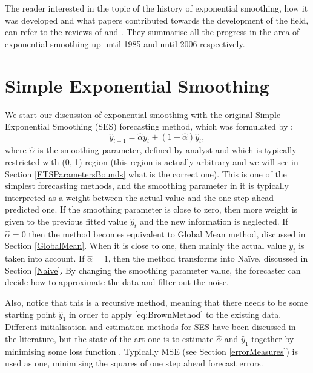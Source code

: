 \documentclass[
]{book}
\theoremstyle{definition}
\theoremstyle{definition}
\theoremstyle{definition}
\theoremstyle{definition}
\theoremstyle{remark}
\begin{document}
The reader interested in the topic of the history of exponential smoothing, how it was developed and what papers contributed towards the development of the field, can refer to the reviews of \citet{Gardner1985} and \citet{Gardner2006}. They summarise all the progress in the area of exponential smoothing up until 1985 and until 2006 respectively.

\hypertarget{SES}{%
\section{Simple Exponential Smoothing}\label{SES}}

We start our discussion of exponential smoothing with the original Simple Exponential Smoothing (SES) forecasting method, which was formulated by \citep{Brown1956}:
\begin{equation}
  \hat{y}_{t+1} = \hat{\alpha} {y}_{t} + (1 - \hat{\alpha}) \hat{y}_{t},
  \label{eq:BrownMethod}
\end{equation}
where \(\hat{\alpha}\) is the smoothing parameter, defined by analyst and which is typically restricted with (0, 1) region (this region is actually arbitrary and we will see in Section \ref{ETSParametersBounds} what is the correct one). This is one of the simplest forecasting methods, and the smoothing parameter in it is typically interpreted as a weight between the actual value and the one-step-ahead predicted one. If the smoothing parameter is close to zero, then more weight is given to the previous fitted value \(\hat{y}_{t}\) and the new information is neglected. If \(\hat{\alpha}=0\) then the method becomes equivalent to Global Mean method, discussed in Section \ref{GlobalMean}. When it is close to one, then mainly the actual value \({y}_{t}\) is taken into account. If \(\hat{\alpha}=1\), then the method transforms into Naïve, discussed in Section \ref{Naive}. By changing the smoothing parameter value, the forecaster can decide how to approximate the data and filter out the noise.

Also, notice that this is a recursive method, meaning that there needs to be some starting point \(\hat{y}_1\) in order to apply \eqref{eq:BrownMethod} to the existing data. Different initialisation and estimation methods for SES have been discussed in the literature, but the state of the art one is to estimate \(\hat{\alpha}\) and \(\hat{y}_{1}\) together by minimising some loss function \citep{Hyndman2002}. Typically MSE (see Section \ref{errorMeasures}) is used as one, minimising the squares of one step ahead forecast errors.
\end{document}
